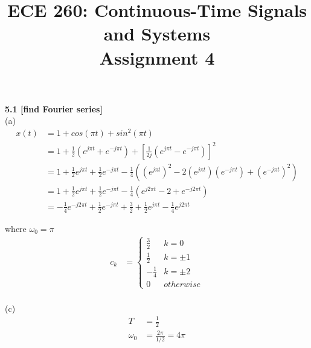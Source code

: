 \documentclass{article}
\title{%
   ECE 260: Continuous-Time Signals and Systems\\
    Assignment 4\\
    }
\date{}
\begin{document}
\maketitle

\bigskip
{\bf 5.1 [find Fourier series]}\\
(a)
\begin{equation*}
\begin{split}
    x(t) &= 1 + cos(\pi t) + sin^2(\pi t)\\
    &= 1 + \frac{1}{2}(e^{j \pi t} + e^{-j \pi t}) + [\frac{1}{2j}(e^{j \pi t} - e^{-j \pi t})]^2\\
    &= 1 + \frac{1}{2}e^{j\pi t} + \frac{1}{2}e^{-j\pi t} - \frac{1}{4}((e^{j\pi t})^2 - 2(e^{j \pi t})(e^{-j\pi t}) + (e^{-j\pi t})^2)\\
    &= 1 + \frac{1}{2}e^{j \pi t} + \frac{1}{2}e^{-j \pi t} - \frac{1}{4}(e^{j 2 \pi t} - 2 + e^{-j 2 \pi t})\\
    &= -\frac{1}{4}e^{-j 2 \pi t} + \frac{1}{2}e^{-j \pi t} + \frac{3}{2} + \frac{1}{2}e^{j \pi t} - \frac{1}{4}e^{j 2 \pi t}
\end{split}
\end{equation*}

where $\omega_0 = \pi$
\begin{equation*}
\begin{split}
    c_k
    &= \begin{cases}
        \frac{3}{2} & k = 0\\
        \frac{1}{2} & k = \pm 1\\
        -\frac{1}{4} & k = \pm 2\\
        0 & otherwise
    \end{cases}\\
\end{split}
\end{equation*}

(c)\\
\begin{equation*}
\begin{split}
    T &= \frac{1}{2}\\
    \omega_0 &= \frac{2\pi}{1/2} = 4\pi
\end{split}
\end{equation*}
\end{document}
